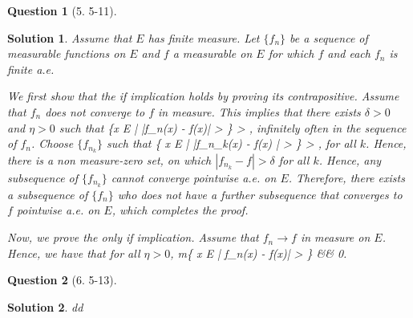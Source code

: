 \documentclass{article} %
\def\eQb#1\eQe{\begin{eqnarray*}#1\end{eqnarray*}}
\theoremstyle{quest}
\newtheorem*{question}{Question}
\newtheorem*{solution}{Solution}
\begin{document}
\begin{question}[5. 5-11]
\end{question}
\begin{solution}
Assume that $E$ has finite measure. Let $\{ f_n \}$ be a sequence of
measurable functions on $E$ and $f$ a measurable on $E$ for which
$f$ and each $f_n$ is finite a.e. 

We first show that the if implication holds by proving its
contrapositive. Assume that $f_n$ does not converge to $f$ in measure. 
This implies that there exists $\delta > 0$ and $\eta > 0$ such that
\eQb
m\{x \in E \> | \> |f_n(x) - f(x)| > \eta \} > \delta,
\eQe
infinitely often in the sequence of $f_n$. Choose $\{ f_{n_k} \}$
such that 
\eQb
m\{ x \in E \> | \> |f_{n_k}(x) - f(x) | > \eta \} > \delta ,
\eQe
for all $k$. Hence, there is a non measure-zero set, on which
$|f_{n_k} - f| > \delta$ for all $k$. Hence, 
any subsequence of $\{ f_{n_k} \}$ cannot 
converge pointwise a.e. on $E$. Therefore, there exists a subsequence
of $\{f_n\}$ who does not have a further subsequence that converges
to $f$ pointwise a.e. on $E$, which completes the proof. 

\smallskip

Now, we prove the only if implication. Assume that $f_n \to f$ in measure
on $E$. Hence, we have that for all $\eta > 0$,
\eQb
\underset{n \to \infty}{\lim} m\{ x \in E 
\> | \>  f_n(x) - f(x)| > \eta \}
&\to& 0.
\eQe

\end{solution}

\bigskip

\begin{question}[6. 5-13]
\end{question}
\begin{solution}
dd
\end{solution}
\end{document}
